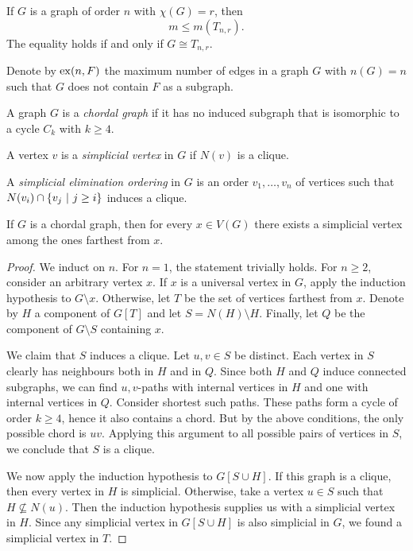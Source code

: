 \begin{posledica}
If $G$ is a graph of order $n$ with $\chi(G) = r$, then
\[
m \leq m(T_{n,r}).
\]
The equality holds if and only if $G \cong T_{n,r}$.
\end{posledica}

\obvs

\begin{definicija}
Denote by $\operatorname{ex}(n, F)$ the maximum number of edges in a graph $G$
with $n(G) = n$ such that $G$ does not contain $F$ as a subgraph.
\end{definicija}

\begin{definicija}
A graph $G$ is a \emph{chordal graph} if
it has no induced subgraph that is isomorphic to a cycle $C_k$ with
$k \geq 4$.
\end{definicija}

\begin{definicija}
A vertex $v$ is a \emph{simplicial vertex}
in $G$ if $N(v)$ is a clique.
\end{definicija}

\begin{definicija}
A
\emph{simplicial elimination ordering}
in $G$ is an order $v_1, \dots, v_n$ of vertices such that
$N(v_i) \cap \left\{v_j~\middle\vert~j \geq i\right\}$ induces a clique.
\end{definicija}

\begin{izrek}
If $G$ is a chordal graph, then for every $x \in V(G)$ there exists
a simplicial vertex among the ones farthest from $x$.
\end{izrek}

\begin{proof}
We induct on $n$. For $n = 1$, the statement trivially holds. For
$n \geq 2$, consider an arbitrary vertex $x$. If $x$ is a universal
vertex in $G$, apply the induction hypothesis to $G \setminus x$.
Otherwise, let $T$ be the set of vertices farthest from $x$. Denote
by $H$ a component of $G[T]$ and let $S = N(H) \setminus H$.
Finally, let $Q$ be the component of $G \setminus S$ containing
$x$.

We claim that $S$ induces a clique. Let $u, v \in S$ be distinct.
Each vertex in $S$ clearly has neighbours both in $H$ and in $Q$.
Since both $H$ and $Q$ induce connected subgraphs, we can find
$u, v$-paths with internal vertices in $H$ and one with internal
vertices in $Q$. Consider shortest such paths. These paths form
a cycle of order $k \geq 4$, hence it also contains a chord. But by
the above conditions, the only possible chord is $uv$. Applying
this argument to all possible pairs of vertices in $S$, we conclude
that $S$ is a clique.

We now apply the induction hypothesis to $G[S \cup H]$. If this
graph is a clique, then every vertex in $H$ is simplicial.
Otherwise, take a vertex $u \in S$ such that
$H \not \subseteq N(u)$. Then the induction hypothesis supplies us
with a simplicial vertex in $H$. Since any simplicial vertex in
$G[S \cup H]$ is also simplicial in $G$, we found a simplicial
vertex in $T$.
\end{proof}

